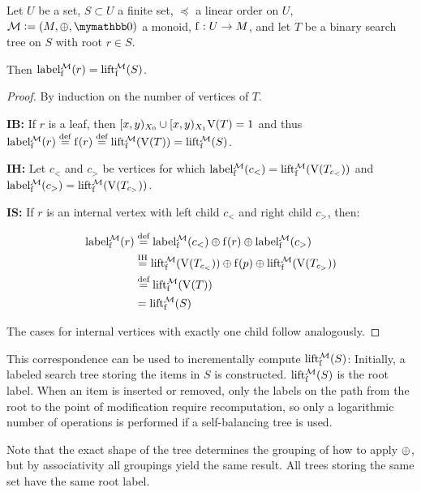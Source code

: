 \begin{proposition}
Let $U$ be a set, $S \subset U$ a finite set, $\preceq$ a linear order on $U$, $\mathcal{M} \defeq (M, \groupaddsym, \neutraladd)$ a monoid, ${\operatorname{f}}: {U} \rightarrow {M}$, and let $T$ be a binary search tree on $S$ with root $r \in S$.

Then $\operatorname{label_{\operatorname{f}}^{\mathcal{M}}}(r) = \operatorname{lift_{\operatorname{f}}^{\mathcal{M}}}(S)$.

\begin{proof}
By induction on the number of vertices of $T$.

\textbf{IB:} If $r$ is a leaf, then $[{x},{y})_{X_0} \cup [{x},{y})_{X_1}{\operatorname{V}(T)} = 1$ and thus $\operatorname{label_{\operatorname{f}}^{\mathcal{M}}}(r) \overset{\text{def}}= \operatorname{f}(r) \overset{\text{def}}= \operatorname{lift_{\operatorname{f}}^{\mathcal{M}}}(\operatorname{V}(T)) = \operatorname{lift_{\operatorname{f}}^{\mathcal{M}}}(S)$.

\textbf{IH:} Let  $c_{<}$ and $c_{>}$ be vertices for which $\operatorname{label_{\operatorname{f}}^{\mathcal{M}}}(c_{<}) = \operatorname{lift_{\operatorname{f}}^{\mathcal{M}}}(\operatorname{V}(T_{c_{<}}))$ and $\operatorname{label_{\operatorname{f}}^{\mathcal{M}}}(c_{>}) = \operatorname{lift_{\operatorname{f}}^{\mathcal{M}}}(\operatorname{V}(T_{c_{>}}))$.

\textbf{IS:} If $r$ is an internal vertex with left child $c_{<}$ and right child $c_{>}$, then:

\begin{align*}
 \operatorname{label_{\operatorname{f}}^{\mathcal{M}}}(r) &\overset{\text{def}}= {\operatorname{label_{\operatorname{f}}^{\mathcal{M}}}(c_{<})} \oplus {{\operatorname{f}(r)} \oplus{\operatorname{label_{\operatorname{f}}^{\mathcal{M}}}(c_{>})}}\\
&\overset{\text{IH}}= {\operatorname{lift_{\operatorname{f}}^{\mathcal{M}}}(\operatorname{V}(T_{c_{<}}))} \oplus {{\operatorname{f}(p)} \oplus{\operatorname{lift_{\operatorname{f}}^{\mathcal{M}}}(\operatorname{V}(T_{c_{>}}))}}\\
& \overset{\text{def}}= \operatorname{lift_{\operatorname{f}}^{\mathcal{M}}}(\operatorname{V}(T))\\
&= \operatorname{lift_{\operatorname{f}}^{\mathcal{M}}}(S)\\
\end{align*}

The cases for internal vertices with exactly one child follow analogously.
\end{proof}
\end{proposition}

This correspondence can be used to incrementally compute $\operatorname{lift_{\operatorname{f}}^{\mathcal{M}}}(S)$: Initially, a labeled search tree storing the items in $S$ is constructed. $\operatorname{lift_{\operatorname{f}}^{\mathcal{M}}}(S)$ is the root label. When an item is inserted or removed, only the labels on the path from the root to the point of modification require recomputation, so only a logarithmic number of operations is performed if a self-balancing tree is used.

Note that the exact shape of the tree determines the grouping of how to apply $\oplus$, but by associativity all groupings yield the same result. All trees storing the same set have the same root label.

